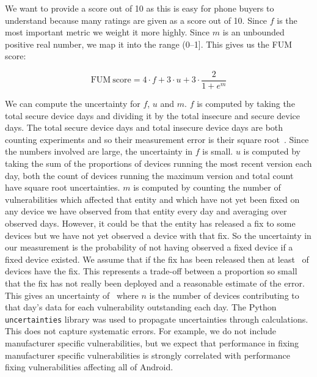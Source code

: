 We want to provide a score out of 10 as this is easy for phone buyers to understand because many ratings are given as a score out of 10.
Since $f$ is the most important metric we weight it more highly.
Since $m$ is an unbounded positive real number, we map it into the range (0--1].
This gives us the FUM score:

\begin{equation}
\mathrm{FUM\ score} = 4 \cdot f + 3 \cdot u + 3 \cdot \frac{2}{1+e^m}
\end{equation}

We can compute the uncertainty for $f$, $u$ and $m$.
$f$ is computed by taking the total secure device days and dividing it by the total insecure and secure device days.
The total secure device days and total insecure device days are both counting experiments and so their measurement error is their square root~\cite{Taylor1997}.
Since the numbers involved are large, the uncertainty in $f$ is small.
$u$ is computed by taking the sum of the proportions of devices running the most recent version each day, both the count of devices running the maximum version and total count have square root uncertainties.
$m$ is computed by counting the number of vulnerabilities which affected that entity and which have not yet been fixed on any device we have observed from that entity every day and averaging over observed days.
However, it could be that the entity has released a fix to some devices but we have not yet observed a device with that fix.
So the uncertainty in our measurement is the probability of not having observed a fixed device if a fixed device existed.
We assume that if the fix has been released then at least \daMeanOutstandingProbability\ of devices have the fix.
This represents a trade-off between a proportion so small that the fix has not really been deployed and a reasonable estimate of the error.
This gives an uncertainty of \daMeanOutstandingUncertaintyEquation\ where $n$ is the number of devices contributing to that day's data for each vulnerability outstanding each day.
The Python \texttt{uncertainties} library was used to propagate uncertainties through calculations.
This does not capture systematic errors.
For example, we do not include manufacturer specific vulnerabilities, but we expect that performance in fixing manufacturer specific vulnerabilities is strongly correlated with performance fixing vulnerabilities affecting all of Android.


